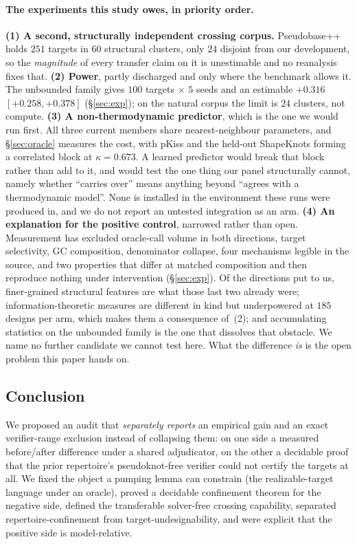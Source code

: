 \documentclass[11pt]{article}
\begin{document}
\paragraph{The experiments this study owes, in priority order.} \textbf{(1) A second, structurally
independent crossing corpus.} Pseudobase++ holds $251$ targets in $60$ structural clusters, only $24$ disjoint
from our development, so the \emph{magnitude} of every transfer claim on it is unestimable and no reanalysis
fixes that. \textbf{(2) Power}, partly discharged and only where the benchmark allows it. The unbounded family
gives $100$ targets $\times$ $5$ seeds and an estimable ${+}0.316$ $[{+}0.258,{+}0.378]$ (\S\ref{sec:exp});
on the natural corpus the limit is $24$ clusters, not compute. \textbf{(3) A non-thermodynamic predictor},
which is the one we would run first. All three current members share nearest-neighbour parameters, and
\S\ref{sec:oracle} measures the cost, with pKiss and the held-out ShapeKnots forming a correlated block at
$\kappa=0.673$. A learned predictor would break that block rather than add to it, and would test the one thing
our panel structurally cannot, namely whether ``carries over'' means anything beyond ``agrees with a
thermodynamic model''. None is installed in the environment these runs were produced in, and we do not report
an untested integration as an arm. \textbf{(4) An explanation for the positive control}, narrowed rather than
open. Measurement has excluded oracle-call volume in both directions, target selectivity, GC composition,
denominator collapse, four mechanisms legible in the source, and two properties that differ at matched
composition and then reproduce nothing under intervention (\S\ref{sec:exp}). Of the directions put to us,
finer-grained structural features are what those last two already were; information-theoretic measures are
different in kind but underpowered at $185$ designs per arm, which makes them a consequence of~(2); and
accumulating statistics on the unbounded family is the one that dissolves that obstacle. We name no further
candidate we cannot test here. What the difference \emph{is} is the open problem this paper hands on.

\subsection{Conclusion}\label{sec:conclusion}
We proposed an audit that \emph{separately reports} an empirical gain and an exact verifier-range exclusion
instead of collapsing them: on one side a measured before/after difference under a shared adjudicator, on the
other a decidable proof that the prior repertoire's pseudoknot-free verifier could not certify the targets at
all. We fixed the object a pumping lemma can constrain (the realizable-target language under an oracle),
proved a decidable confinement theorem for the negative side, defined the transferable solver-free crossing
capability, separated repertoire-confinement from target-undesignability, and were explicit that the positive
side is model-relative.
\end{document}
